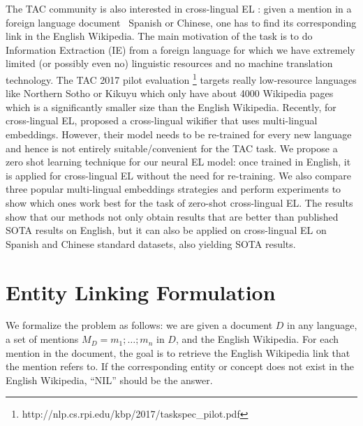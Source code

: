 \documentclass[letterpaper]{article} \usepackage{aaai18}  \usepackage{times}  \usepackage{helvet}  \usepackage{courier}  \usepackage{url}  \usepackage{graphicx}  \frenchspacing  \setlength{\pdfpagewidth}{8.5in}  \setlength{\pdfpageheight}{11in}  \usepackage{latexsym}
\begin{document}
The TAC community is also interested in cross-lingual EL \cite{tsai2016cross,sil2016one}: given a mention in a foreign language document \eg\ Spanish or Chinese, one has to find its corresponding link in the English Wikipedia. The main motivation of the task is to do Information Extraction (IE) from a foreign language for which we have extremely limited (or possibly even no) linguistic resources and no machine translation technology. The TAC 2017 pilot evaluation \footnote{http://nlp.cs.rpi.edu/kbp/2017/taskspec\_pilot.pdf} targets really low-resource languages like Northern Sotho or Kikuyu which only have about 4000 Wikipedia pages which is a significantly smaller size than the English Wikipedia. Recently, for cross-lingual EL, \cite{tsai2016cross} proposed a cross-lingual wikifier that uses multi-lingual embeddings. However, their model needs to be re-trained for every new language and hence is not entirely suitable/convenient for the TAC task. We propose a zero shot learning technique \cite{palatucci2009zero,socher2013zero} for our neural EL model: once trained in English, it is applied for cross-lingual EL without the need for re-training. We also compare three popular multi-lingual embeddings strategies and perform experiments to show which ones work best for the task of zero-shot cross-lingual EL. The results show that our methods not only obtain results that are better than published SOTA results on English, but it can also be applied on cross-lingual EL on Spanish and Chinese standard datasets, also yielding SOTA results.






























 \section{Entity Linking Formulation}
We formalize the problem as follows: we are given
a document $D$ in any language, a set of mentions
$M_D = {m_1;\ldots;m_n}$ in $D$, and the English
Wikipedia. For each mention in the document, the
goal is to retrieve the English Wikipedia link that the
mention refers to. If the corresponding entity or concept
does not exist in the English Wikipedia, ``NIL”
should be the answer.
\end{document}
